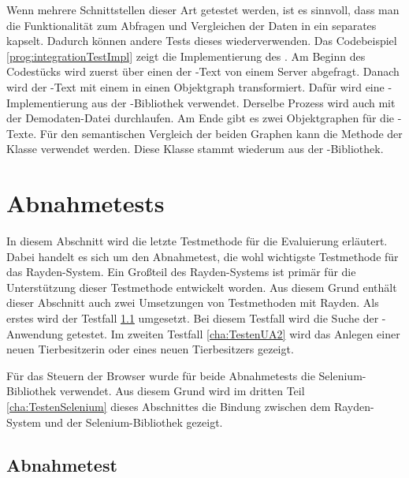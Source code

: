 \SuperPar
Wenn mehrere Schnittstellen dieser Art getestet werden, ist es sinnvoll, dass man die Funktionalität zum Abfragen und Vergleichen der Daten in ein separates  kapselt. Dadurch können andere Tests dieses  wiederverwenden. Das Codebeispiel \ref{prog:integrationTestImpl} zeigt die Implementierung des . Am Beginn des Codestücks wird zuerst über einen  der -Text von einem Server abgefragt. Danach wird der -Text mit einem  in einen Objektgraph transformiert. Dafür wird eine -Implementierung aus der -Bibliothek \cite{Guava} verwendet. Derselbe Prozess wird auch mit der Demodaten-Datei durchlaufen. Am Ende gibt es zwei Objektgraphen für die -Texte. Für den semantischen Vergleich der beiden Graphen kann die Methode  der Klasse  verwendet werden. Diese Klasse stammt wiederum aus der -Bibliothek.

\section{Abnahmetests}
\label{cha:TestenUA}

In diesem Abschnitt wird die letzte Testmethode für die Evaluierung erläutert. Dabei handelt es sich um den Abnahmetest, die wohl wichtigste Testmethode für das Rayden-System. Ein Großteil des Rayden-Systems ist primär für die Unterstützung dieser Testmethode entwickelt worden. Aus diesem Grund enthält dieser Abschnitt auch zwei Umsetzungen von Testmethoden mit Rayden. Als erstes wird der Testfall  \ref{cha:TestenUA1} umgesetzt. Bei diesem Testfall wird die Suche der -Anwendung getestet. Im zweiten Testfall \ref{cha:TestenUA2} wird das Anlegen einer neuen Tierbesitzerin oder eines neuen Tierbesitzers gezeigt. 

\SuperPar
Für das Steuern der Browser wurde für beide Abnahmetests die Selenium-Bibliothek verwendet. Aus diesem Grund wird im dritten Teil \ref{cha:TestenSelenium} dieses Abschnittes die Bindung zwischen dem Rayden-System und der Selenium-Bibliothek gezeigt. 


\subsection{Abnahmetest }
\label{cha:TestenUA1}

